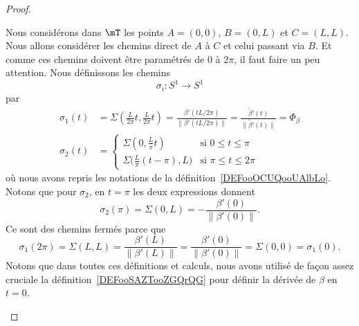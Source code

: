 \begin{proof}
\begin{subproof}
		Nous considérons dans \( \mT\) les points \( A=(0,0)\), \( B=(0,L)\) et \( C=(L,L)\). Nous allons considérer les chemins direct de \( A\) à \( C\) et celui passant via \( B\). Et comme ces chemins doivent être paramétrés de \( 0\) à \( 2 \pi\), il faut faire un peu attention. Nous définissons les chemins
		\begin{equation}
			\sigma_i\colon S^1\to S^1
		\end{equation}
		par
		\begin{subequations}
			\begin{align}
				\sigma_1(t) & =\Sigma\left( \frac{ L }{ 2\pi }t,\frac{ L }{ 2\pi }t \right)=\frac{ \beta'(tL/2\pi) }{ \| \beta'(tL/2\pi) \| }=\frac{ \tilde \beta'(t) }{ \|\tilde  \beta'(t) \| }=\Phi_{\beta} \\
				\sigma_2(t) & =\begin{cases}
					               \Sigma(0,\frac{ L }{ \pi }t)                  & \text{si } 0\leq t\leq \pi   \\
					               \Sigma\big( \frac{ L }{ \pi }(t-\pi),L  \big) & \text{si }\pi\leq t\leq 2\pi
				               \end{cases}
			\end{align}
		\end{subequations}
		où nous avons repris les notations de la définition~\ref{DEFooOCUQooUAlbLo}. Notons que pour \( \sigma_2\), en \( t=\pi\) les deux expressions donnent
		\begin{equation}
			\sigma_2(\pi)=\Sigma(0,L)=-\frac{ \beta'(0) }{ \| \beta'(0) \| }.
		\end{equation}
		Ce sont des chemins fermés parce que
		\begin{equation}
			\sigma_1(2\pi)=\Sigma(L,L)=\frac{ \beta'(L) }{ \| \beta'(L) \| }=\frac{ \beta'(0) }{ \| \beta'(0) \| }=\Sigma(0,0)=\sigma_1(0).
		\end{equation}
		Notons que dans toutes ces définitions et calculs, nous avons utilisé de façon assez cruciale la définition~\ref{DEFooSAZTooZGQrQG} pour définir la dérivée de \( \beta\) en \( t=0\).


\end{subproof}
\end{proof}
